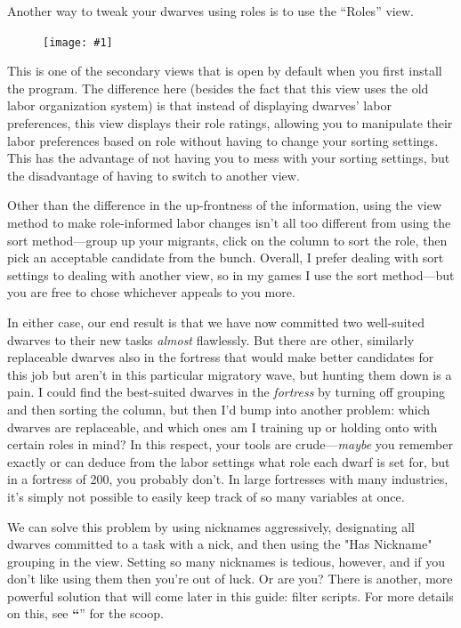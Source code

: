 \documentclass[]{article}
\newcommand{\jump}[1] {\textbf{``\nameref{sec:#1}}''}
\newcommand{\fullfigure}[1] {
\begin{figure}[h!]
\texttt{[image: \#1]}
\end{figure}
}
\begin{document}
Another way to tweak your dwarves using roles is to use the ``Roles'' view.

\fullfigure{Sec3Fig10+}

This is one of the secondary views that is open by default when you first install the program. The
difference here (besides the fact that this view uses the old labor organization system) is that instead
of displaying dwarves' labor preferences, this view displays their role ratings, allowing you to
manipulate their labor preferences based on role without having to change your sorting settings. This has
the advantage of not having you to mess with your sorting settings, but the disadvantage of having to
switch to another view.

Other than the difference in the up-frontness of the information, using the view method to make
role-informed labor changes isn't all too different from using the sort method---group up your
migrants, click on the column to sort the role, then pick an acceptable candidate from the bunch.
Overall, I prefer dealing with sort settings to dealing with another view, so in my games I use the sort
method---but you are free to chose whichever appeals to you more.

In either case, our end result is that we have now committed two well-suited dwarves to their new
tasks \emph{almost} flawlessly. But there are other, similarly replaceable dwarves also in the fortress
that would make better candidates for this job but aren't in this particular migratory wave, but hunting
them down is a pain. I could find the best-suited dwarves in the \emph{fortress} by turning off grouping
and then sorting the column, but then I'd bump into another problem: which dwarves are replaceable, and
which ones am I training up or holding onto with certain roles in mind? In this respect, your tools are
crude---\emph{maybe} you remember exactly or can deduce from the labor settings what role each dwarf is
set for, but in a fortress of 200, you probably don't. In large fortresses with many industries, it's
simply not possible to easily keep track of so many variables at once.

We can solve this problem by using nicknames aggressively, designating all dwarves committed to a task
with a nick, and then using the "Has Nickname" grouping in the view. Setting so many nicknames is
tedious, however, and if you don't like using them then you're out of luck. Or are you? There is another,
more powerful solution that will come later in this guide: filter scripts. For more details on this, see
\jump{Filter Scripts} for the scoop.
\end{document}
